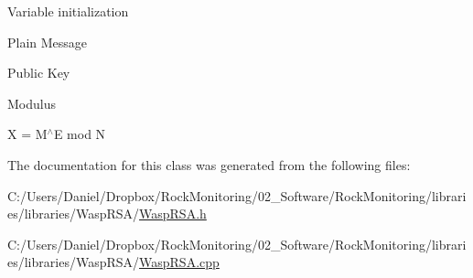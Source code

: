 Variable initialization

Plain Message

Public Key

Modulus

X = M$^\wedge$E mod N 

The documentation for this class was generated from the following files\+:\begin{DoxyCompactItemize}
\item 
C\+:/\+Users/\+Daniel/\+Dropbox/\+Rock\+Monitoring/02\+\_\+\+Software/\+Rock\+Monitoring/libraries/libraries/\+Wasp\+R\+S\+A/\hyperlink{_wasp_r_s_a_8h}{Wasp\+R\+S\+A.\+h}\item 
C\+:/\+Users/\+Daniel/\+Dropbox/\+Rock\+Monitoring/02\+\_\+\+Software/\+Rock\+Monitoring/libraries/libraries/\+Wasp\+R\+S\+A/\hyperlink{_wasp_r_s_a_8cpp}{Wasp\+R\+S\+A.\+cpp}\end{DoxyCompactItemize}
